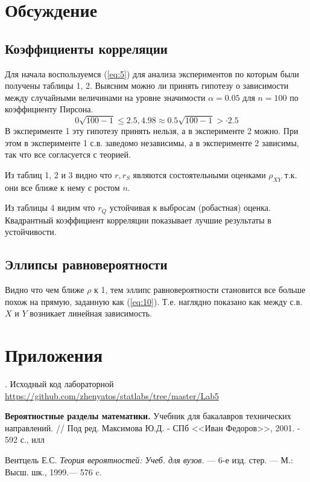 \documentclass[12pt,a4paper]{article}
\begin{document}
\section{Обсуждение}
\subsection{Коэффициенты корреляции}
Для начала воспользуемся (\ref{eq:5}) для анализа экспериментов по которым были получены таблицы 1, 2. Выясним можно ли принять гипотезу о зависимости между случайными величинами на уровне значимости $\alpha = 0.05$ для $n = 100$ по коэффициенту Пирсона.
$$0 \sqrt{100 - 1} \leq 2.5, 4.98 \approx 0.5 \sqrt{100 - 1} > \cdot 2.5$$ 
В эксперименте 1 эту гипотезу принять нельзя, а в эксперименте 2 можно. При этом в эксперименте 1 с.в. заведомо независимы, а в эксперименте 2 зависимы, так что все согласуется с теорией. 

Из таблиц 1, 2 и 3 видно что $r, r_S$ являются состоятельными оценками $\rho_{XY}$ т.к. они все ближе к нему с ростом $n$.

Из таблицы 4 видим что $r_Q$ устойчивая к выбросам (робастная) оценка. Квадрантный коэффициент корреляции показывает лучшие результаты в устойчивости.

\subsection{Эллипсы равновероятности}
Видно что чем ближе $\rho$ к 1, тем эллипс равновероятности становится все больше похож на прямую, заданную как (\ref{eq:10}). Т.е. наглядно показано как между с.в. $X$ и $Y$ возникает линейная зависимость.
\pagebreak

\section{Приложения}
. Исходный код лабораторной {\url{https://github.com/zhenyatos/statlabs/tree/master/Lab5}}

\begin{thebibliography}{9} 
	 \textbf{Вероятностные разделы математики.} Учебник для бакалавров технических направлений. // Под ред. Максимова Ю.Д. - СПб <<Иван Федоров>>, 2001. - 592 с., илл
	
	 Вентцель Е.С. \textit{Теория вероятностей: Учеб. для вузов.} — 6-е изд. стер. — М.: Высш. шк., 1999.— 576 c.
\end{thebibliography}
\end{document}
